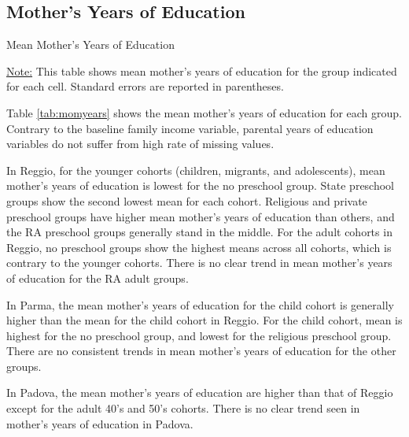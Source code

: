 \documentclass[12pt]{article}
\begin{document}
\subsection{Mother's Years of Education}
\begin{table}[H]
\caption{Mean Mother's Years of Education} \label{tab:momyears}
\begin{center}
\scalebox{0.8}{

}
\end{center}
\begin{footnotesize}
\vspace{0.5mm} 

\underline{Note:} This table shows mean mother's years of education for the group indicated for each cell. Standard errors are reported in parentheses. 
\end{footnotesize}
\end{table}

Table \ref{tab:momyears} shows the mean mother's years of education for each group. Contrary to the baseline family income variable, parental years of education variables do not suffer from high rate of missing values. 

In Reggio, for the younger cohorts (children, migrants, and adolescents), mean mother's years of education is lowest for the no preschool group. State preschool groups show the second lowest mean for each cohort. Religious and private preschool groups have higher mean mother's years of education than others, and the RA preschool groups generally stand in the middle. For the adult cohorts in Reggio, no preschool groups show the highest means across all cohorts, which is contrary to the younger cohorts. There is no clear trend in mean mother's years of education for the RA adult groups. 

In Parma, the mean mother's years of education for the child cohort is generally higher than the mean for the child cohort in Reggio. For the child cohort, mean is highest for the no preschool group, and lowest for the religious preschool group. There are no consistent trends in mean mother's years of education for the other groups. 

In Padova, the mean mother's years of education are higher than that of Reggio except for the adult 40's and 50's cohorts. There is no clear trend seen in mother's years of education in Padova.
\end{document}
